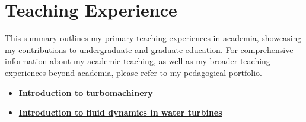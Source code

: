 \newpage
\section{Teaching Experience}{}

This summary outlines my primary teaching experiences in academia, showcasing my contributions to undergraduate and graduate education. For comprehensive information about my academic teaching, as well as my broader teaching experiences beyond academia, please refer to my pedagogical portfolio.


\begin{multicols}{2}
\raggedcolumns
\begin{itemize}[leftmargin=*,topsep=10pt,itemsep=1em]
    \item{\textbf{Introduction to turbomachinery}}

    \item{\href{https://energiforsk.se/konferenser/genomforda/svenskt-vattenkraftcentrums-forskarskola-2022/curriculum-fluid-dynamics/}{\textbf{Introduction to fluid dynamics in water turbines}}}


\end{itemize}
\end{multicols}
